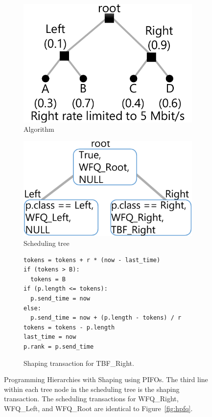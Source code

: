 \begin{figure}
\begin{subfigure}[b]{0.2\textwidth}
\includegraphics[width=\textwidth]{pifo_hshaping_example.pdf}
\caption{Algorithm}
\label{fig:hshaping_algo}
\end{subfigure}
\vrule
\begin{subfigure}[b]{0.3\textwidth}
\includegraphics[width=\textwidth]{pifo_hshaping_program.pdf}
\caption{Scheduling tree}
\label{fig:hshaping_tree}
\end{subfigure}
\vrule
\begin{subfigure}[b]{0.5\textwidth}
\begin{lstlisting}[style=customc]
tokens = tokens + r * (now - last_time)
if (tokens > B):
  tokens = B
if (p.length <= tokens):
  p.send_time = now
else:
  p.send_time = now + (p.length - tokens) / r
tokens = tokens - p.length
last_time = now
p.rank = p.send_time
\end{lstlisting}
\caption{Shaping transaction for TBF\_Right.}
\label{fig:hshaping_shaping_trans}
\end{subfigure}
\caption{Programming Hierarchies with Shaping using PIFOs. The third line
within each tree node in the scheduling tree is the shaping transaction. The
scheduling transactions for WFQ\_Right, WFQ\_Left, and WFQ\_Root are identical
to Figure~\ref{fig:hpfq}.}
\label{fig:hshaping}
\end{figure}

